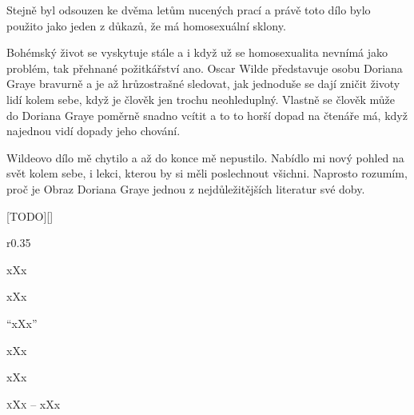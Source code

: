 \documentclass{extarticle} %
\begin{document}
\noindent
Stejně byl odsouzen ke dvěma letům nucených prací a právě toto dílo bylo použito jako jeden z důkazů, že má homosexuální sklony.

\noindent
Bohémský život se vyskytuje stále a i když už se homosexualita nevnímá jako problém, tak přehnané požitkářství ano.
Oscar Wilde představuje osobu Doriana Graye bravurně a je až hrůzostrašné sledovat, jak jednoduše se dají zničit životy lidí kolem sebe, když je člověk jen trochu neohleduplný.
Vlastně se člověk může do Doriana Graye poměrně snadno vcítit a to to horší dopad na čtenáře má, když najednou vidí dopady jeho chování.

\noindent 
Wildeovo dílo mě chytilo a až do konce mě nepustilo.
Nabídlo mi nový pohled na svět kolem sebe, i lekci, kterou by si měli poslechnout všichni.
Naprosto rozumím, proč je Obraz Doriana Graye jednou z nejdůležitějších literatur své doby.

\vfill


\newpage


\changefontsize{8pt}

[TODO][\killpage]

\noindent\begin{wrapfigure}{r}{0.35\textwidth}
\tiny

\setlength{\parindent}{3pt}
xXx
\end{wrapfigure}


\noindent xXx



\noindent 
\enquote{xXx}

\noindent 
xXx

\noindent 
xXx

\noindent 
\textsc{xXx --} xXx \\
\end{document}
